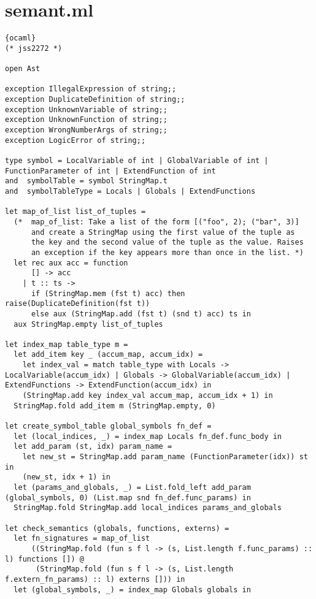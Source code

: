 \section{semant.ml}
\begin{lstlisting}{ocaml}
(* jss2272 *)

open Ast

exception IllegalExpression of string;;
exception DuplicateDefinition of string;;
exception UnknownVariable of string;;
exception UnknownFunction of string;;
exception WrongNumberArgs of string;;
exception LogicError of string;;

type symbol = LocalVariable of int | GlobalVariable of int | FunctionParameter of int | ExtendFunction of int
and  symbolTable = symbol StringMap.t
and  symbolTableType = Locals | Globals | ExtendFunctions

let map_of_list list_of_tuples =
  (*  map_of_list: Take a list of the form [("foo", 2); ("bar", 3)]
      and create a StringMap using the first value of the tuple as
      the key and the second value of the tuple as the value. Raises
      an exception if the key appears more than once in the list. *)
  let rec aux acc = function
      [] -> acc
    | t :: ts ->
      if (StringMap.mem (fst t) acc) then raise(DuplicateDefinition(fst t))
      else aux (StringMap.add (fst t) (snd t) acc) ts in
  aux StringMap.empty list_of_tuples

let index_map table_type m =
  let add_item key _ (accum_map, accum_idx) =
    let index_val = match table_type with Locals -> LocalVariable(accum_idx) | Globals -> GlobalVariable(accum_idx) | ExtendFunctions -> ExtendFunction(accum_idx) in
    (StringMap.add key index_val accum_map, accum_idx + 1) in
  StringMap.fold add_item m (StringMap.empty, 0)

let create_symbol_table global_symbols fn_def =
  let (local_indices, _) = index_map Locals fn_def.func_body in
  let add_param (st, idx) param_name =
    let new_st = StringMap.add param_name (FunctionParameter(idx)) st in
    (new_st, idx + 1) in
  let (params_and_globals, _) = List.fold_left add_param (global_symbols, 0) (List.map snd fn_def.func_params) in
  StringMap.fold StringMap.add local_indices params_and_globals

let check_semantics (globals, functions, externs) =
  let fn_signatures = map_of_list
      ((StringMap.fold (fun s f l -> (s, List.length f.func_params) :: l) functions []) @
       (StringMap.fold (fun s f l -> (s, List.length f.extern_fn_params) :: l) externs [])) in
  let (global_symbols, _) = index_map Globals globals in


\end{lstlisting}

